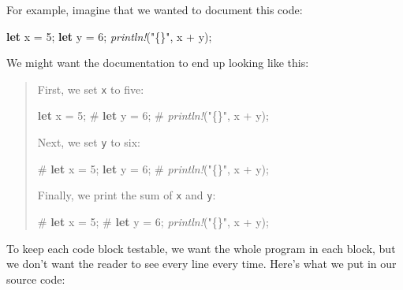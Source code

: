 \documentclass[a4paper,]{book}
\newenvironment{Shaded}{\begin{snugshade}}{\end{snugshade}}
\newcommand{\KeywordTok}[1]{\textcolor[rgb]{0.13,0.29,0.53}{\textbf{{#1}}}}
\newcommand{\DecValTok}[1]{\textcolor[rgb]{0.00,0.00,0.81}{{#1}}}
\newcommand{\StringTok}[1]{\textcolor[rgb]{0.31,0.60,0.02}{{#1}}}
\newcommand{\PreprocessorTok}[1]{\textcolor[rgb]{0.56,0.35,0.01}{\textit{{#1}}}}
\newcommand{\NormalTok}[1]{{#1}}
\begin{document}
For example, imagine that we wanted to document this code:

\begin{Shaded}
\begin{Highlighting}[]
\KeywordTok{let} \NormalTok{x = }\DecValTok{5}\NormalTok{;}
\KeywordTok{let} \NormalTok{y = }\DecValTok{6}\NormalTok{;}
\PreprocessorTok{println!}\NormalTok{(}\StringTok{"\{\}"}\NormalTok{, x + y);}
\end{Highlighting}
\end{Shaded}

We might want the documentation to end up looking like this:

\begin{quote}
First, we set \texttt{x} to five:

\begin{Shaded}
\begin{Highlighting}[]
\KeywordTok{let} \NormalTok{x = }\DecValTok{5}\NormalTok{;}
\NormalTok{# }\KeywordTok{let} \NormalTok{y = }\DecValTok{6}\NormalTok{;}
\NormalTok{# }\PreprocessorTok{println!}\NormalTok{(}\StringTok{"\{\}"}\NormalTok{, x + y);}
\end{Highlighting}
\end{Shaded}

Next, we set \texttt{y} to six:

\begin{Shaded}
\begin{Highlighting}[]
\NormalTok{# }\KeywordTok{let} \NormalTok{x = }\DecValTok{5}\NormalTok{;}
\KeywordTok{let} \NormalTok{y = }\DecValTok{6}\NormalTok{;}
\NormalTok{# }\PreprocessorTok{println!}\NormalTok{(}\StringTok{"\{\}"}\NormalTok{, x + y);}
\end{Highlighting}
\end{Shaded}

Finally, we print the sum of \texttt{x} and \texttt{y}:

\begin{Shaded}
\begin{Highlighting}[]
\NormalTok{# }\KeywordTok{let} \NormalTok{x = }\DecValTok{5}\NormalTok{;}
\NormalTok{# }\KeywordTok{let} \NormalTok{y = }\DecValTok{6}\NormalTok{;}
\PreprocessorTok{println!}\NormalTok{(}\StringTok{"\{\}"}\NormalTok{, x + y);}
\end{Highlighting}
\end{Shaded}
\end{quote}

To keep each code block testable, we want the whole program in each
block, but we don't want the reader to see every line every time. Here's
what we put in our source code:
\end{document}
